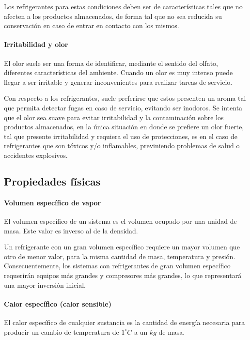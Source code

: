	Los refrigerantes para estas condiciones deben ser de características tales que no afecten a los productos almacenados, de forma tal que no sea reducida su conservación en caso de entrar en contacto con los mismos. 

	\paragraph{Irritabilidad y olor} El olor suele ser una forma de identificar, mediante el sentido del olfato, diferentes características del ambiente. Cuando un olor es muy intenso puede llegar a ser irritable y generar inconvenientes para realizar tareas de servicio.
	
	Con respecto a los refrigerantes, suele preferirse que estos presenten un aroma tal que permita detectar fugas en caso de servicio, evitando ser inodoros. Se intenta que el olor sea suave para evitar irritabilidad y la contaminación sobre los productos almacenados, en la única situación en donde se prefiere un olor fuerte, tal que presente irritabilidad y requiera el uso de protecciones, es en el caso de refrigerantes que son tóxicos y/o inflamables, previniendo problemas de salud o accidentes explosivos.

	\subsection{Propiedades físicas}

	\paragraph{Volumen específico de vapor} El volumen específico de un sistema es el volumen ocupado por una unidad de masa. Este valor es inverso al de la densidad. 

	Un refrigerante con un gran volumen específico requiere un mayor volumen que otro de menor valor, para la misma cantidad de masa, temperatura y presión. Consecuentemente, los sistemas con refrigerantes de gran volumen específico requerirán equipos más grandes y compresores más grandes, lo que representará una mayor inversión inicial. 

	\newpage

	\paragraph{Calor específico (calor sensible)} El calor específico de cualquier sustancia es la cantidad de energía necesaria para producir un cambio de temperatura de $1^\circ C$ a un $kg$ de masa.

